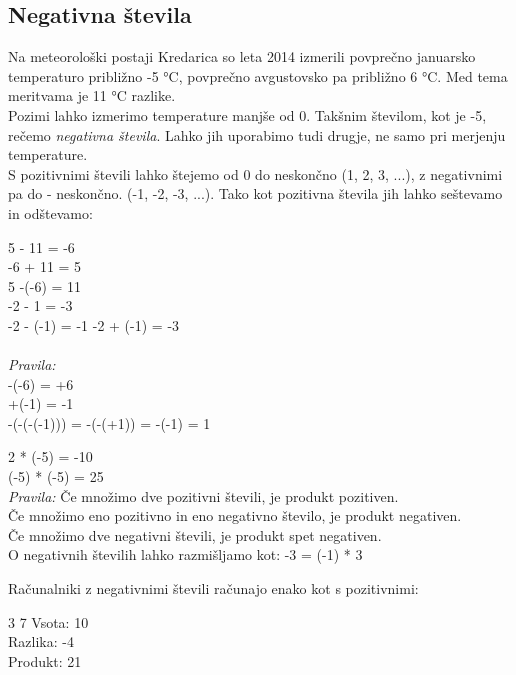 \documentclass{book}
\begin{document}
\subsection*{Negativna števila}
Na meteorološki postaji Kredarica so leta 2014 izmerili povprečno januarsko temperaturo približno -5 °C, povprečno avgustovsko pa približno 6 °C.
Med tema meritvama je 11 °C razlike. \\
Pozimi lahko izmerimo temperature manjše od 0. Takšnim številom, kot je -5, rečemo \emph{negativna števila}. Lahko jih uporabimo tudi drugje, ne samo pri merjenju temperature. \\
S pozitivnimi števili lahko štejemo od 0 do neskončno (1, 2, 3, ...), z negativnimi pa do - neskončno. (-1, -2, -3, ...). Tako kot pozitivna števila jih lahko seštevamo in odštevamo:

\begin{examples}
5 - 11 = -6 \\
-6 + 11 = 5 \\
5 -(-6) = 11 \\
-2 - 1 = -3 \\
-2 - (-1) = -1
-2 + (-1) = -3 \\\\
\emph{Pravila:}\\
-(-6) = +6\\
+(-1) = -1 \\
-(-(-(-1))) = -(-(+1)) = -(-1) = 1
\end{examples}

\begin{examples}
2 * (-5) = -10 \\
(-5) * (-5) = 25 \\

\emph{Pravila:}
Če množimo dve pozitivni števili, je produkt pozitiven. \\
Če množimo eno pozitivno in eno negativno število, je produkt negativen. \\
Če množimo dve negativni števili, je produkt spet negativen. \\
O negativnih številih lahko razmišljamo kot: -3 = (-1) * 3
\end{examples}

Računalniki z negativnimi števili računajo enako kot s pozitivnimi:

\begin{examples}


\begin{inout}
3 7
\tcblower
Vsota: 10 \\
Razlika: -4 \\
Produkt: 21
\end{inout}

\end{examples}
\end{document}
